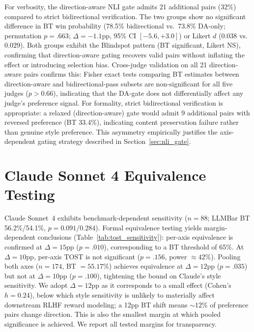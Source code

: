For verbosity, the direction-aware NLI gate admits 21 additional pairs (32\%) compared to strict bidirectional verification.
The two groups show no significant difference in BT win probability (78.5\% bidirectional vs.\ 73.8\% DA-only; permutation $p = .663$; $\Delta = {-}1.1$pp, 95\% CI $[{-}5.6, {+}3.0]$) or Likert $d$ ($0.038$ vs.\ $0.029$).
Both groups exhibit the Blindspot pattern (BT significant, Likert NS), confirming that direction-aware gating recovers valid pairs without inflating the effect or introducing selection bias.
Cross-judge validation on all 21 direction-aware pairs confirms this: Fisher exact tests comparing BT estimates between direction-aware and bidirectional-pass subsets are non-significant for all five judges ($p > 0.66$), indicating that the DA-gate does not differentially affect any judge's preference signal.
For formality, strict bidirectional verification is appropriate: a relaxed (direction-aware) gate would admit 9 additional pairs with reversed preference (BT 33.4\%), indicating content preservation failure rather than genuine style preference.
This asymmetry empirically justifies the axis-dependent gating strategy described in Section~\ref{sec:nli_gate}.

\section{Claude Sonnet 4 Equivalence Testing}
\label{app:claude_tost}

Claude Sonnet~4 exhibits benchmark-dependent sensitivity ($n = 88$; LLMBar BT 56.2\%/54.1\%, $p = 0.091$/$0.284$).
Formal equivalence testing \citep[TOST;][]{lakens2017equivalence} yields margin-dependent conclusions (Table~\ref{tab:tost_sensitivity}): per-axis equivalence is confirmed at $\Delta = 15$pp ($p = .010$), corresponding to a BT threshold of 65\%.
At $\Delta = 10$pp, per-axis TOST is not significant ($p = .156$, power $\approx 42\%$).
Pooling both axes ($n = 174$, BT $= 55.17\%$) achieves equivalence at $\Delta = 12$pp ($p = .035$) but not at $\Delta = 10$pp ($p = .100$), tightening the bound on Claude's style sensitivity.
We adopt $\Delta = 12$pp as it corresponds to a small effect (Cohen's $h = 0.24$), below which style sensitivity is unlikely to materially affect downstream RLHF reward modeling; a 12pp BT shift means ${\sim}12\%$ of preference pairs change direction. This is also the smallest margin at which pooled significance is achieved.
We report all tested margins for transparency.

